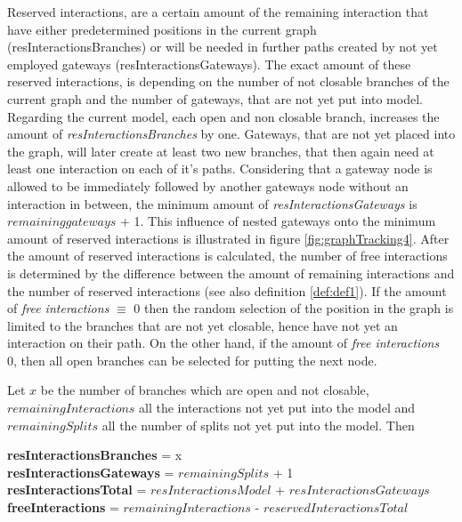 Reserved interactions, are a certain amount of the remaining interaction that have either predetermined positions in the current graph (resInteractionsBranches) or will be needed in further paths created by not yet employed gateways (resInteractionsGateways). The exact amount of these reserved interactions, is depending on the number of not closable branches of the current graph and the number of gateways, that are not yet put into model. Regarding the current model, each open and non closable branch, increases the amount of \textit{resInteractionsBranches} by one. Gateways, that are not yet placed into the graph, will later create at least two new branches, that then again need at least one interaction on each of it's paths. Considering that a gateway node is allowed to be immediately followed by another gateways node without an interaction in between, the minimum amount of \textit{resInteractionsGateways} is $remaining gateways$ + 1. This influence of nested gateways onto the minimum amount of reserved interactions is illustrated in figure \ref{fig:graphTracking4}. After the amount of reserved interactions is calculated, the number of free interactions is determined by the difference between the amount of remaining interactions and the number of reserved interactions (see also definition \ref{def:def1}). If the amount of \textit{free interactions} $\equiv$ 0 then the random selection of the position in the graph is limited to the branches that are not yet closable, hence have not yet an interaction on their path. On the other hand, if the amount of \textit{free interactions} $\>$ 0, then all open branches can be selected for putting the next node.

\begin{Def}
	Let $x$ be the number of branches which are open and not closable, \\$remainingInteractions$ all the interactions not yet put into the model and \\$remainingSplits$ all the number of splits not yet put into the model. Then
	\begin{center}
		\textbf{resInteractionsBranches} = x\\
		\textbf{resInteractionsGateways} = $remainingSplits$ + 1\\
		\textbf{resInteractionsTotal} = $resInteractionsModel$ + $resInteractionsGateways$\\
		\textbf{freeInteractions} = $remainingInteractions$ - $reservedInteractionsTotal$
	\end{center}
	\label{def:def1}
\end{Def}


